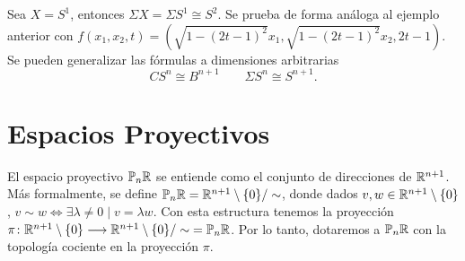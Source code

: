 \documentclass[GTS.tex]{subfiles}
\begin{document}
\begin{ej} Sea $X=S^1$, entonces $\Sigma X=\Sigma S^1\cong S^2$. Se prueba de forma análoga al ejemplo anterior con $f(x_1,x_2,t)=(\sqrt{1-(2t-1)^2}x_1,\sqrt{1-(2t-1)^2}x_2,2t-1)$. Se pueden generalizar las fórmulas a dimensiones arbitrarias
\[
CS^n\cong B^{n+1}\qquad \Sigma S^n\cong S^{n+1}.
\]
\end{ej}



\section{Espacios Proyectivos}
El espacio proyectivo $\mathbb{P}_n\mathbb{R}$ se entiende como el conjunto de direcciones de $\mathbb{R}^{n+1}$. Más formalmente, se define $\mathbb{P}_n\mathbb{R}=\mathbb{R}^{n+1}\setminus\{0\}/\sim$, donde dados $v,w\in\mathbb{R}^{n+1}\setminus\{0\}$, $v\sim w\Leftrightarrow\exists\lambda\neq 0\mid v=\lambda w$. Con esta estructura tenemos la proyección $\pi\colon{\mathbb{R}^{n+1}\setminus\{0\}}\longrightarrow{\mathbb{R}^{n+1}\setminus\{0\}/\sim}=\mathbb{P}_n\mathbb{R}$. Por lo tanto, dotaremos a $\mathbb{P}_n\mathbb{R}$ con la topología cociente en la proyección $\pi$.
\end{document}
